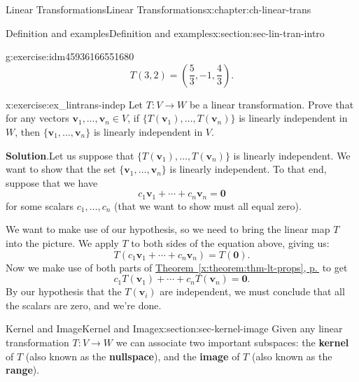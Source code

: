 \documentclass[oneside,10pt,]{book}
\newcommand{\blocktitlefont}{\relax}
\newcommand{\xreffont}{\relax}
\newcommand{\terminology}[1]{\textbf{#1}}
\numberwithin{equation}{section}
\newcommand{\vv}{\mathbf{v}}
\begin{document}
\begin{chapterptx}{Linear Transformations}{}{Linear Transformations}{}{}{x:chapter:ch-linear-trans}
\begin{sectionptx}{Definition and examples}{}{Definition and examples}{}{}{x:section:sec-lin-tran-intro}
\begin{inlineexercise}{}{g:exercise:idm45936166551680}
\begin{equation*}
T(3,2) = \left(\frac53, -1, \frac43\right)\text{.}
\end{equation*}
%
\end{inlineexercise}%
\begin{inlineexercise}{}{x:exercise:ex_lintrans-indep}%
Let \(T:V\to W\) be a linear transformation. Prove that for any vectors \(\vv_1,\ldots, \vv_n\in V\), if \(\{T(\vv_1),\ldots, T(\vv_n)\}\) is linearly independent in \(W\), then \(\{\vv_1,\ldots, \vv_n\}\) is linearly independent in \(V\).%
\par\smallskip%
\noindent\textbf{\blocktitlefont Solution}.\label{g:solution:idm45936166535584}{}\hypertarget{g:solution:idm45936166535584}{}\quad{}Let us suppose that \(\{T(\vv_1),\ldots, T(\vv_n)\}\) is linearly independent. We want to show that the set \(\{\vv_1,\ldots, \vv_n\}\) is linearly independent. To that end, suppose that we have%
\begin{equation*}
c_1\vv_1+\cdots + c_n\vv_n=\mathbf{0}
\end{equation*}
for some scalars \(c_1,\ldots, c_n\) (that we want to show must all equal zero).%
\par
We want to make use of our hypothesis, so we need to bring the linear map \(T\) into the picture. We apply \(T\) to both sides of the equation above, giving us:%
\begin{equation*}
T(c_1\vv_1+\cdots + c_n\vv_n)=T(\mathbf{0})\text{.}
\end{equation*}
Now we make use of both parts of \hyperref[x:theorem:thm-lt-props]{Theorem~{\xreffont\ref{x:theorem:thm-lt-props}}, p.\,\pageref{x:theorem:thm-lt-props}} to get%
\begin{equation*}
c_1T(\vv_1)+\cdots +c_nT(\vv_n) = \mathbf{0}\text{.}
\end{equation*}
By our hypothesis that the \(T(\vv_i)\) are independent, we must conclude that all the scalars are zero, and we're done.%
\end{inlineexercise}%
\end{sectionptx}
%
%
\typeout{************************************************}
\typeout{************************************************}
%
\begin{sectionptx}{Kernel and Image}{}{Kernel and Image}{}{}{x:section:sec-kernel-image}
Given any linear transformation \(T:V\to W\) we can associate two important subspaces: the \terminology{kernel} of \(T\) (also known as the \terminology{nullspace}), and the \terminology{image} of \(T\) (also known as the \terminology{range}).%

\end{sectionptx}
\end{chapterptx}
\end{document}
